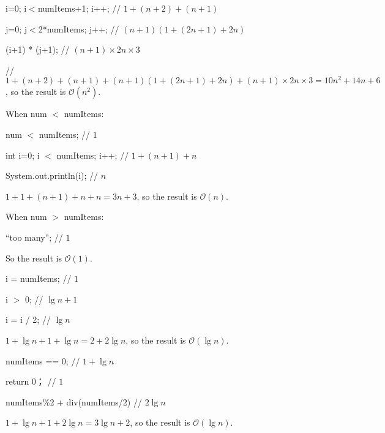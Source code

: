 \begin{homeworkProblem}
i=0; i$<$numItems+1; i++;    // $1 + (n+2) + (n+1)$

j=0; j$<$2*numItems; j++;    // $(n+1)(1 + (2n+1) + 2n)$

(i+1) * (j+1);             // $(n+1)\times 2n\times 3$

// $1 + (n+2) + (n+1) + (n+1)(1 + (2n+1) + 2n) +(n+1)\times 2n\times 3 = 10n^2 + 14n + 6$, so the result is $\mathcal{O}(n^2)$.
\end{homeworkProblem}

\begin{homeworkProblem}
When num $<$ numItems:

num $<$ numItems;            // $1$

int i=0; i $<$ numItems; i++;  // $1 + (n+1) + n$

System.out.println(i);                         // $n$

$1 + 1 + (n+1) + n + n = 3n + 3$, so the result is $\mathcal{O}(n)$.

When num $>$ numItems:

``too many'';              // $1$

So the result is $\mathcal{O}(1)$.
\end{homeworkProblem}

\begin{homeworkProblem}
i = numItems;         // $1$

i $>$ 0;                // $\lg n +1$

i = i / 2;            // $\lg n$

$1 + \lg n + 1 + \lg n = 2 + 2\lg n$, so the result is $\mathcal{O}(\lg n)$.
\end{homeworkProblem}

\begin{homeworkProblem}{}
numItems == 0;           // $1 + \lg n$

return 0；               // $1$

numItems\%2 + div(numItems/2)   // $2\lg n$

$1 + \lg n + 1 + 2\lg n = 3\lg n + 2$, so the result is $\mathcal{O}(\lg n)$.
\end{homeworkProblem}
